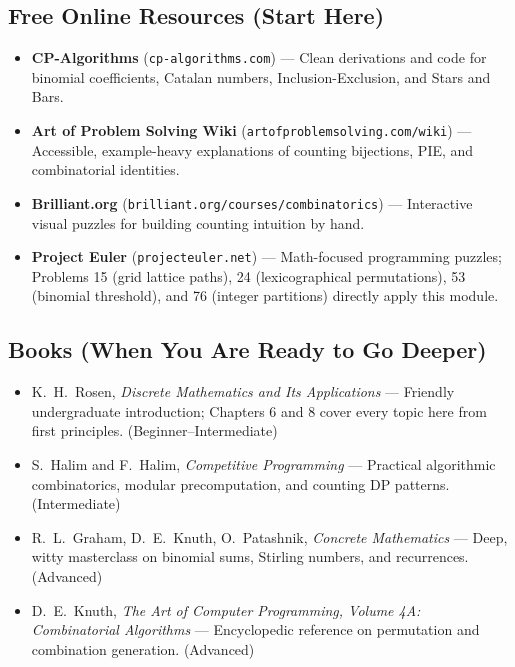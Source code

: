 \documentclass[11pt,a4paper]{article}
\theoremstyle{definition}
\begin{document}
\subsection*{Free Online Resources (Start Here)}
\begin{itemize}
    \item \textbf{CP-Algorithms} (\texttt{cp-algorithms.com}) --- Clean derivations and code for binomial coefficients, Catalan numbers, Inclusion-Exclusion, and Stars and Bars.
    \item \textbf{Art of Problem Solving Wiki} (\texttt{artofproblemsolving.com/wiki}) --- Accessible, example-heavy explanations of counting bijections, PIE, and combinatorial identities.
    \item \textbf{Brilliant.org} (\texttt{brilliant.org/courses/combinatorics}) --- Interactive visual puzzles for building counting intuition by hand.
    \item \textbf{Project Euler} (\texttt{projecteuler.net}) --- Math-focused programming puzzles; Problems 15 (grid lattice paths), 24 (lexicographical permutations), 53 (binomial threshold), and 76 (integer partitions) directly apply this module.
\end{itemize}

\subsection*{Books (When You Are Ready to Go Deeper)}
\begin{itemize}
    \item K.\ H.\ Rosen, \emph{Discrete Mathematics and Its Applications} --- Friendly undergraduate introduction; Chapters 6 and 8 cover every topic here from first principles. (Beginner--Intermediate)
    \item S.\ Halim and F.\ Halim, \emph{Competitive Programming} --- Practical algorithmic combinatorics, modular precomputation, and counting DP patterns. (Intermediate)
    \item R.\ L.\ Graham, D.\ E.\ Knuth, O.\ Patashnik, \emph{Concrete Mathematics} --- Deep, witty masterclass on binomial sums, Stirling numbers, and recurrences. (Advanced)
    \item D.\ E.\ Knuth, \emph{The Art of Computer Programming, Volume 4A: Combinatorial Algorithms} --- Encyclopedic reference on permutation and combination generation. (Advanced)
\end{itemize}

\end{document}
